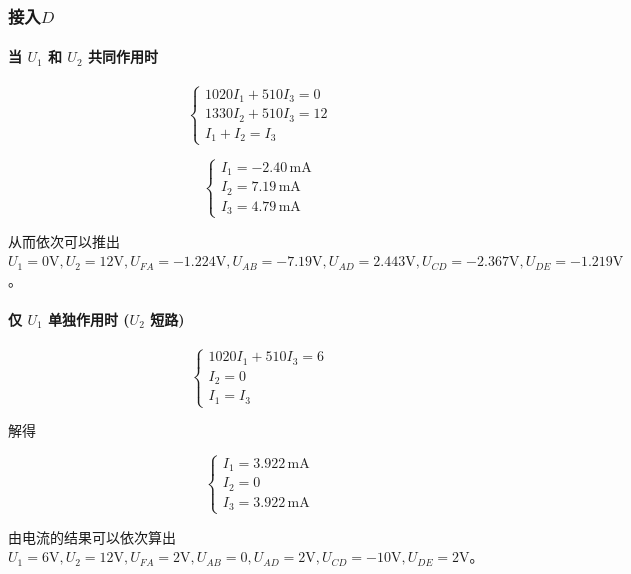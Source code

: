 \documentclass{Report} %
\begin{document}
\subsubsection{接入$D$}
\paragraph{当 $U_1$ 和 $U_2$ 共同作用时}
\begin{equation}
\begin{cases}
    1020I_1 + 510I_3 = 0 \\
    1330I_2 + 510I_3 = 12 \\
    I_1 + I_2 = I_3
\end{cases}
\end{equation}

\begin{equation}
\begin{cases}
    I_1 = -2.40\,\text{mA} \\
    I_2 = 7.19\,\text{mA} \\
    I_3 = 4.79\,\text{mA}
\end{cases}
\end{equation}

从而依次可以推出 $U_1 = 0\text{V}, U_2 = 12\text{V}, U_{FA} = -1.224\text{V}, U_{AB} = -7.19\text{V}, U_{AD} = 2.443\text{V}, U_{CD} = -2.367\text{V}, U_{DE} = -1.219\text{V}$。
\paragraph{仅 $U_1$ 单独作用时 ($U_2$ 短路)}
\begin{equation}
\begin{cases}
    1020I_1 + 510I_3 = 6 \\
    I_2 = 0 \\
    I_1 = I_3
\end{cases}
\end{equation}

解得

\begin{equation}
\begin{cases}
    I_1 = 3.922\,\text{mA} \\
    I_2 = 0 \\
    I_3 = 3.922\,\text{mA}
\end{cases}
\end{equation}

由电流的结果可以依次算出 $U_1 = 6\text{V}, U_2 = 12\text{V}, U_{FA} = 2\text{V}, U_{AB} = 0, U_{AD} = 2\text{V}, U_{CD} = -10\text{V}, U_{DE} = 2\text{V}$。
\end{document}
